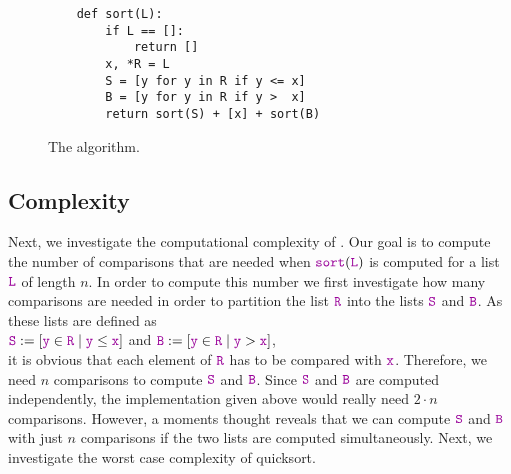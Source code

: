 \begin{figure}[!ht]
  \centering
\begin{verbatim}
    def sort(L):
        if L == []:
            return []
        x, *R = L
        S = [y for y in R if y <= x]
        B = [y for y in R if y >  x]
        return sort(S) + [x] + sort(B)
\end{verbatim}
\vspace*{-0.3cm}
  \caption{The  algorithm.}
  \label{fig:quick-sort.stlx}
\end{figure}

\subsection{Complexity}
Next, we investigate the computational complexity of .
Our goal is to compute the number of comparisons that are needed when
$\mytt{sort}(\mytt{L})$ is computed for a list $\mytt{L}$ of length $n$.  In order to compute this number we
first investigate how many comparisons are needed in order to partition the list $\mytt{R}$
into the lists $\mytt{S}$ and $\mytt{B}$.  As these lists are defined as 
\\[0.2cm]
\hspace*{1.3cm}
 $\mytt{S} := [\mytt{y} \in \mytt{R} \mid \mytt{y} \leq \mytt{x}]$ \quad and \quad
 $\mytt{B} := [\mytt{y} \in \mytt{R} \mid \mytt{y} > \mytt{x}]$,
\\[0.2cm]
it is obvious that each element of $\mytt{R}$ has to be compared with $\mytt{x}$.
Therefore, we need $n$ comparisons to compute $\mytt{S}$ and $\mytt{B}$.  Since $\mytt{S}$ and
$\mytt{B}$ are computed independently, the implementation given above 
would really need $2 \cdot n$ comparisons.  However, a moments thought reveals that we can compute $\mytt{S}$ and $\mytt{B}$
with just $n$ comparisons if the two lists are computed simultaneously.
Next, we investigate the worst case complexity of quicksort.


